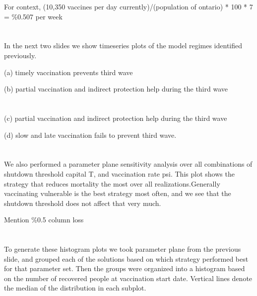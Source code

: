 \documentclass{article}
\begin{document}


For context, 
(10,350 vaccines per day currently)/(population of ontario) * 100 * 7 = \%0.507 per week 

\section{}

In the next two slides we show timeseries plots of the model regimes identified previously.


(a) timely vaccination prevents third wave

(b) partial vaccination and indirect protection help during the third wave

\section[Slide]{}

(c) partial vaccination and indirect protection help during the third wave

(d) slow and late vaccination fails to prevent third wave.

\section{}

We also performed a parameter plane sensitivity analysis over all combinations of shutdown threshold capital T, and vaccination rate psi. This plot shows the strategy that reduces mortality the most over all realizations.Generally vaccinating vulnerable is the best strategy most often, and we see that the shutdown threshold does not affect that very much. 

Mention \%0.5 column loss
\section{}

To generate these histogram plots we took parameter plane from the previous slide, and grouped each of the solutions based on which strategy performed best for that parameter set. Then the groups were organized into a histogram based on the number of recovered people at vaccination start date. Vertical lines denote the median of the distribution in each subplot.
\end{document}
